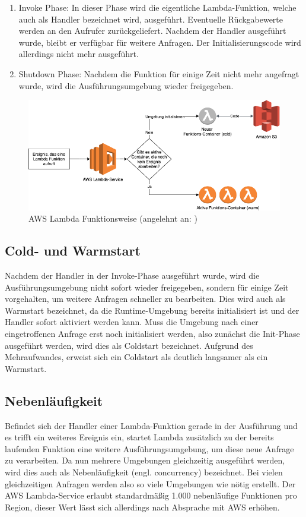 \begin{enumerate}
\item Invoke Phase: In dieser Phase wird die eigentliche Lambda-Funktion, welche auch als Handler bezeichnet wird, ausgeführt. Eventuelle Rückgabewerte werden an den Aufrufer zurückgeliefert. Nachdem der Handler ausgeführt wurde, bleibt er verfügbar für weitere Anfragen. Der Initialisierungscode wird allerdings nicht mehr ausgeführt.
    
\item Shutdown Phase: Nachdem die Funktion für einige Zeit nicht mehr angefragt wurde, wird die Ausführungsumgebung wieder freigegeben. 
\end{enumerate}

\begin{figure}[H]
    \includegraphics[width=\textwidth]{img/lambda-architecture.png}
    
    \caption[AWS Lambda Funktionsweise]{AWS Lambda Funktionsweise (angelehnt an: \cite{noauthor_serverless_2017})}
    \label{fig:lambda-architecture}
\end{figure}

\subsection{Cold- und Warmstart}
Nachdem der Handler in der Invoke-Phase ausgeführt wurde, wird die Ausführungsumgebung nicht sofort wieder freigegeben, sondern für einige Zeit vorgehalten, um weitere Anfragen schneller zu bearbeiten. Dies wird auch als Warmstart bezeichnet, da die Runtime-Umgebung bereits initialisiert ist und der Handler sofort aktiviert werden kann.
Muss die Umgebung nach einer eingetroffenen Anfrage erst noch initialisiert werden, also zunächst die Init-Phase ausgeführt werden, wird dies als Coldstart bezeichnet. Aufgrund des Mehraufwandes, erweist sich ein Coldstart als deutlich langsamer als ein Warmstart. 

\subsection{Nebenläufigkeit}
Befindet sich der Handler einer Lambda-Funktion gerade in der Ausführung und es trifft ein weiteres Ereignis ein, startet Lambda zusätzlich zu der bereits laufenden Funktion eine weitere Ausführungsumgebung, um diese neue Anfrage zu verarbeiten. Da nun mehrere Umgebungen gleichzeitig ausgeführt werden, wird dies auch als Nebenläufigkeit (engl. concurrency) bezeichnet. Bei vielen gleichzeitigen Anfragen werden also so viele Umgebungen wie nötig erstellt. Der \ac{AWS} Lambda-Service erlaubt standardmäßig 1.000 nebenläufige Funktionen pro Region, dieser Wert lässt sich allerdings nach Absprache mit \ac{AWS} erhöhen.

